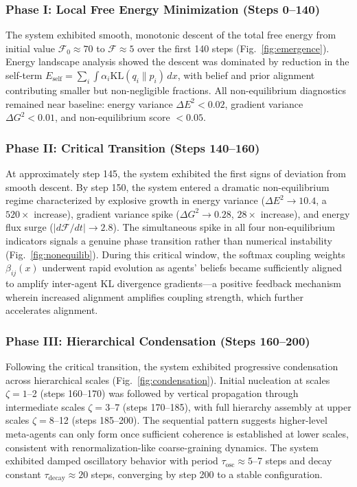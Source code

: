 \documentclass[11pt]{article}
\begin{document}
\subsubsection{Phase I: Local Free Energy Minimization (Steps 0--140)}

The system exhibited smooth, monotonic descent of the total free energy from initial value $\mathcal{F}_0 \approx 70$ to $\mathcal{F} \approx 5$ over the first 140 steps (Fig.~\ref{fig:emergence}). Energy landscape analysis showed the descent was dominated by reduction in the self-term $E_{\text{self}} = \sum_i \int \alpha_i \mathrm{KL}(q_i \| p_i) \, dx$, with belief and prior alignment contributing smaller but non-negligible fractions. All non-equilibrium diagnostics remained near baseline: energy variance $\Delta E^2 < 0.02$, gradient variance $\Delta G^2 < 0.01$, and non-equilibrium score $< 0.05$.

\subsubsection{Phase II: Critical Transition (Steps 140--160)}

At approximately step 145, the system exhibited the first signs of deviation from smooth descent. By step 150, the system entered a dramatic non-equilibrium regime characterized by explosive growth in energy variance ($\Delta E^2 \to 10.4$, a $520\times$ increase), gradient variance spike ($\Delta G^2 \to 0.28$, $28\times$ increase), and energy flux surge ($|d\mathcal{F}/dt| \to 2.8$). The simultaneous spike in all four non-equilibrium indicators signals a genuine phase transition rather than numerical instability (Fig.~\ref{fig:nonequilib}). During this critical window, the softmax coupling weights $\beta_{ij}(x)$ underwent rapid evolution as agents' beliefs became sufficiently aligned to amplify inter-agent KL divergence gradients---a positive feedback mechanism wherein increased alignment amplifies coupling strength, which further accelerates alignment.

\subsubsection{Phase III: Hierarchical Condensation (Steps 160--200)}

Following the critical transition, the system exhibited progressive condensation across hierarchical scales (Fig.~\ref{fig:condensation}). Initial nucleation at scales $\zeta = 1$--2 (steps 160--170) was followed by vertical propagation through intermediate scales $\zeta = 3$--7 (steps 170--185), with full hierarchy assembly at upper scales $\zeta = 8$--12 (steps 185--200). The sequential pattern suggests higher-level meta-agents can only form once sufficient coherence is established at lower scales, consistent with renormalization-like coarse-graining dynamics. The system exhibited damped oscillatory behavior with period $\tau_{\text{osc}} \approx 5$--7 steps and decay constant $\tau_{\text{decay}} \approx 20$ steps, converging by step 200 to a stable configuration.
\end{document}

